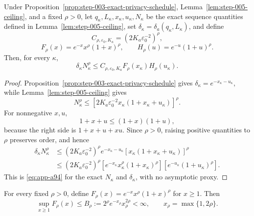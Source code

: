 \begin{lemma}
\label{lem:step-005-factorization}
Under Proposition~\ref{prop:step-003-exact-privacy-schedule},
Lemma~\ref{lem:step-005-ceiling}, and a fixed \(\rho>0\), let
\(q_\kappa,L_\kappa,x_\kappa,u_\kappa,N_\kappa\) be the exact
sequence quantities defined in Lemma~\ref{lem:step-005-ceiling}, set
\(\delta_\kappa=\delta_a(q_\kappa,L_\kappa)\), and define
\[
C_{\rho,\varepsilon_0,K_a}
=(2K_a\varepsilon_0^{-2})^\rho,
\]
\[
F_\rho(x)=e^{-x}x^\rho(1+x)^\rho,\qquad
H_\rho(u)=e^{-u}(1+u)^\rho.
\]
Then, for every \(\kappa\),
\begin{equation}
\delta_\kappa N_\kappa^\rho
\leq
C_{\rho,\varepsilon_0,K_a}
F_\rho(x_\kappa)H_\rho(u_\kappa).
\label{eq:app-a94}
\end{equation}
\end{lemma}

\begin{proof}
Proposition~\ref{prop:step-003-exact-privacy-schedule} gives
\(\delta_\kappa=e^{-x_\kappa-u_\kappa}\), while
Lemma~\ref{lem:step-005-ceiling} gives
\[
N_\kappa^\rho
\leq
\left[
2K_a\varepsilon_0^{-2}
x_\kappa(1+x_\kappa+u_\kappa)
\right]^\rho.
\]
For nonnegative \(x,u\),
\begin{equation}
1+x+u\leq(1+x)(1+u),
\label{eq:app-a95}
\end{equation}
because the right side is \(1+x+u+xu\).  Since \(\rho>0\), raising
positive quantities to \(\rho\) preserves order, and hence
\begin{equation}
\begin{aligned}
\delta_\kappa N_\kappa^\rho
&\leq
(2K_a\varepsilon_0^{-2})^\rho
e^{-x_\kappa-u_\kappa}
[x_\kappa(1+x_\kappa+u_\kappa)]^\rho\\
&\leq
(2K_a\varepsilon_0^{-2})^\rho
[e^{-x_\kappa}x_\kappa^\rho(1+x_\kappa)^\rho]
[e^{-u_\kappa}(1+u_\kappa)^\rho].
\end{aligned}
\label{eq:app-a96}
\end{equation}
This is \eqref{eq:app-a94} for the exact \(N_\kappa\) and
\(\delta_\kappa\), with no asymptotic proxy.
\end{proof}

\begin{lemma}
\label{lem:step-005-x-supremum}
For every fixed \(\rho>0\), define
\(F_\rho(x)=e^{-x}x^\rho(1+x)^\rho\) for \(x\geq1\).  Then
\begin{equation}
\sup_{x\geq1}F_\rho(x)
\leq
B_\rho
:=
2^\rho e^{-x_\rho}x_\rho^{2\rho}
<\infty,
\qquad
x_\rho=\max\{1,2\rho\}.
\label{eq:app-a97}
\end{equation}
\end{lemma}

